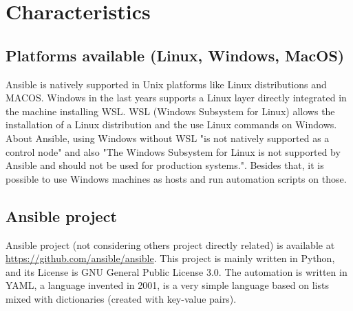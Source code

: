 \documentclass[12pt,a4paper,openright,twoside]{book}
\begin{document}



\section{Characteristics}

\subsection{Platforms available (Linux, Windows, MacOS)}
Ansible is natively supported in Unix platforms like Linux distributions and MACOS.
Windows in the last years supports a Linux layer directly integrated in the machine installing WSL.
WSL (Windows Subsystem for Linux) allows the installation of a Linux distribution and the use Linux commands on Windows.
About Ansible, using Windows without WSL "is not natively supported as a control node"\cite{ansibleDocInstallIntro} and also
"The Windows Subsystem for Linux is not supported by Ansible and should not be used for production systems."\cite{ansibleWinFaq}.
Besides that, it is possible to use Windows machines as hosts and run automation scripts on those.

\subsection{Ansible project}

Ansible project (not considering others project directly related) is available at \url{https://github.com/ansible/ansible}\cite{ansibleGithub}.
This project is mainly written in Python, and its License is GNU General Public License 3.0.
The automation is written in YAML, a language invented in 2001, is a very simple language based on lists mixed with dictionaries (created with key-value pairs).
\end{document}
